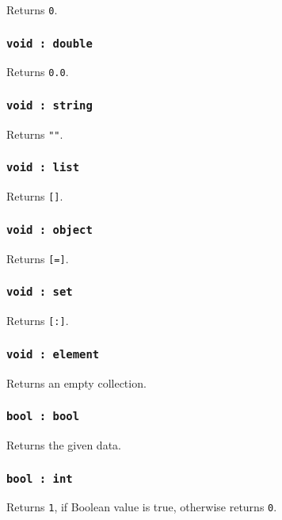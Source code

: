 Returns \texttt{0}.

\subsubsection{\texttt{void : double}}

Returns \texttt{0.0}.

\subsubsection{\texttt{void : string}}

Returns \texttt{""}.

\subsubsection{\texttt{void : list}}

Returns \texttt{[]}.

\subsubsection{\texttt{void : object}}

Returns \texttt{[=]}.

\subsubsection{\texttt{void : set}}

Returns \texttt{[:]}.

\subsubsection{\texttt{void : element}}

Returns an empty collection.

\subsubsection{\texttt{bool : bool}}

Returns the given data.

\subsubsection{\texttt{bool : int}}

Returns \texttt{1}, if Boolean value is true, otherwise returns \texttt{0}.

